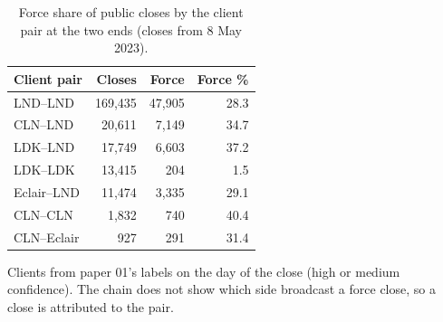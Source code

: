 \begin{table}[t]
\centering
\caption{Force share of public closes by the client pair at the two ends (closes from 8 May 2023).}
\label{tab:client_pairs}
\footnotesize
\begin{tabular}{lrrr}
\toprule
Client pair & Closes & Force & Force \% \\
\midrule
LND--LND & 169{,}435 & 47{,}905 & 28.3 \\
CLN--LND & 20{,}611 & 7{,}149 & 34.7 \\
LDK--LND & 17{,}749 & 6{,}603 & 37.2 \\
LDK--LDK & 13{,}415 & 204 & 1.5 \\
Eclair--LND & 11{,}474 & 3{,}335 & 29.1 \\
CLN--CLN & 1{,}832 & 740 & 40.4 \\
CLN--Eclair & 927 & 291 & 31.4 \\
\bottomrule
\end{tabular}
\par\smallskip\parbox{\linewidth}{\scriptsize Clients from paper 01's labels on the day of the close (high or medium confidence). The chain does not show which side broadcast a force close, so a close is attributed to the pair.}
\end{table}
